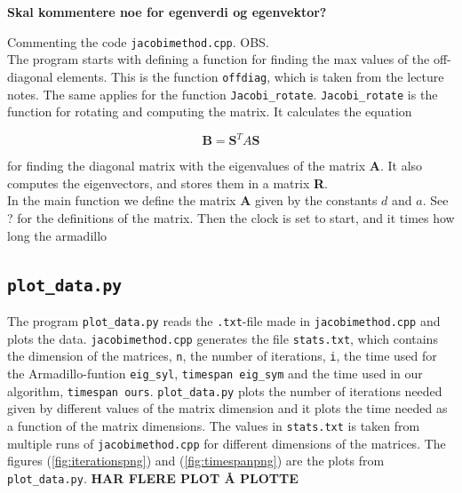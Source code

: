 \documentclass{article}
\begin{document}
\textbf{Skal kommentere noe for egenverdi og egenvektor?}

Commenting the code \texttt{jacobimethod.cpp}.  OBS. \\

The program starts with defining a function for finding the max values of the off-diagonal elements. This is the function \texttt{offdiag}, which is taken from the lecture notes. The same applies for the function \texttt{Jacobi\_rotate}. \texttt{Jacobi\_rotate} is the function for rotating and computing the matrix. It calculates the equation

\begin{equation*}
    \textbf{B} = \textbf{S}^T A \textbf{S}
\end{equation*}

for finding the diagonal matrix with the eigenvalues of the matrix \textbf{A}. It also computes the eigenvectors, and stores them in a matrix \textbf{R}. \\

In the main function we define the matrix \textbf{A} given by the constants $d$ and $a$. See ? for the definitions of the matrix. Then the clock is set to start, and it times how long the armadillo \\

\vspace{2cm}

\subsection{\texttt{plot\_data.py}}

The program \texttt{plot\_data.py} reads the \texttt{.txt}-file made in \texttt{jacobimethod.cpp} and plots the data. \texttt{jacobimethod.cpp} generates the file \texttt{stats.txt}, which contains the dimension of the matrices, \texttt{n}, the number of iterations, \texttt{i}, the time used for the Armadillo-funtion \texttt{eig\_syl}, \texttt{timespan eig\_sym} and the time used in our algorithm, \texttt{timespan ours}.
\texttt{plot\_data.py} plots the number of iterations needed given by different values of the matrix dimension and it plots the time needed as a function of the matrix dimensions. The values in \texttt{stats.txt} is taken from multiple runs of \texttt{jacobimethod.cpp} for different dimensions of the matrices. The figures (\ref{fig:iterationspng}) and (\ref{fig:timespanpng}) are the plots from \texttt{plot\_data.py}. \textbf{HAR FLERE PLOT Å PLOTTE} \\
\end{document}
